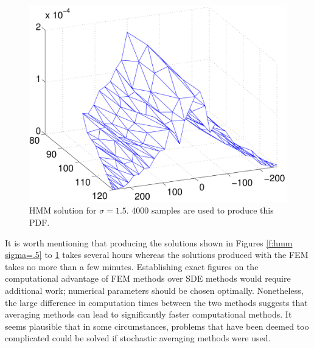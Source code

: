 \begin{figure}
\begin{center}
\includegraphics[width=\textwidth]{figures/hmm_pdf_sigma_1p5}
\end{center}
\caption{HMM solution for $\sigma = 1.5$. 4000 samples are used to produce this PDF.}
\label{f:hmm sigma=1.5}
\end{figure}

It is worth mentioning that producing the solutions shown in Figures \ref{f:hmm sigma=.5} to \ref{f:hmm sigma=1.5} takes several hours whereas the solutions produced with the FEM takes no more than a few minutes. Establishing exact figures on the computational advantage of FEM methods over SDE methods would require additional work; numerical parameters should be chosen optimally. Nonetheless, the large difference in computation times between the two methods suggests that averaging methods can lead to significantly faster computational methods. It seems plausible that in some circumstances, problems that have been deemed too complicated could be solved if stochastic averaging methods were used.

